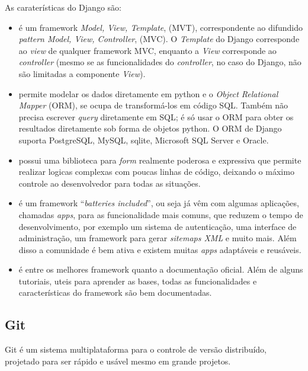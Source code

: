 As caraterísticas do Django são:
\begin{itemize}
\item é um framework \emph{Model, View, Template}, (MVT),
  correspondente ao difundido \emph{pattern Model, View, Controller},
  (MVC). O \emph{Template} do Django corresponde ao \emph{view} de
  qualquer framework MVC, enquanto a \emph{View} corresponde ao
  \emph{controller} (mesmo se as funcionalidades do \emph{controller},
  no caso do Django, não são limitadas a componente \emph{View}).
\item permite modelar os dados diretamente em python e o
  \emph{Object Relational Mapper} (ORM), se ocupa de transformá-los em
  código SQL. Também não precisa escrever \emph{query} diretamente em
  SQL; é só usar o ORM para obter os resultados diretamente sob forma
  de objetos python. O ORM de Django suporta PostgreSQL, MySQL, sqlite,
  Microsoft SQL Server e Oracle.
\item possui uma biblioteca para \emph{form} realmente poderosa e
  expressiva que permite realizar logicas complexas com poucas linhas
  de código, deixando o máximo controle ao desenvolvedor para todas as
  situações. 
\item é um framework ``\emph{batteries included}'', ou seja já vêm com
  algumas aplicações, chamadas \emph{apps}, para as funcionalidade
  mais comuns, que reduzem o tempo de desenvolvimento, por exemplo um
  sistema de autenticação, uma interface de administração, um
  framework para gerar \emph{sitemaps XML} e muito mais. Além disso a
  comunidade é bem ativa e existem muitas \emph{apps} adaptáveis e
  reusáveis. 
\item é entre os melhores framework quanto a documentação
  oficial. Além de alguns tutoriais, uteis para aprender as bases,
  todas as funcionalidades e características do framework são
  bem documentadas.
\end{itemize}


\subsection{Git}\label{sec:GIT}
Git é um sistema multiplataforma para o controle de versão
distribuído, projetado para ser rápido e usável mesmo em grande
projetos. 

